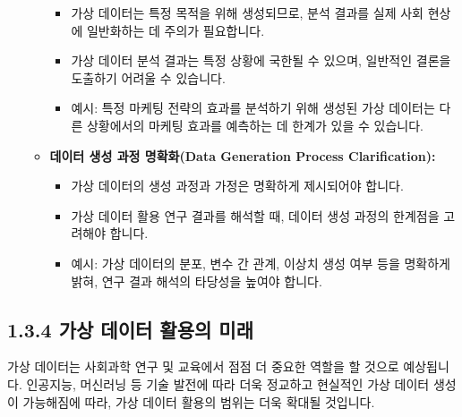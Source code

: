 \documentclass[
  letterpaper,
]{book}
\providecommand{\tightlist}{%
  \setlength{\itemsep}{0pt}\setlength{\parskip}{0pt}}
\begin{document}
\begin{itemize}
\begin{itemize}
    \begin{itemize}
    \tightlist
    \item
      가상 데이터는 특정 목적을 위해 생성되므로, 분석 결과를 실제 사회
      현상에 일반화하는 데 주의가 필요합니다.
    \item
      가상 데이터 분석 결과는 특정 상황에 국한될 수 있으며, 일반적인
      결론을 도출하기 어려울 수 있습니다.
    \item
      예시: 특정 마케팅 전략의 효과를 분석하기 위해 생성된 가상 데이터는
      다른 상황에서의 마케팅 효과를 예측하는 데 한계가 있을 수 있습니다.
    \end{itemize}
  \item
    \textbf{데이터 생성 과정 명확화(Data Generation Process
    Clarification):}

    \begin{itemize}
    \tightlist
    \item
      가상 데이터의 생성 과정과 가정은 명확하게 제시되어야 합니다.
    \item
      가상 데이터 활용 연구 결과를 해석할 때, 데이터 생성 과정의
      한계점을 고려해야 합니다.
    \item
      예시: 가상 데이터의 분포, 변수 간 관계, 이상치 생성 여부 등을
      명확하게 밝혀, 연구 결과 해석의 타당성을 높여야 합니다.
    \end{itemize}
  \end{itemize}
\end{itemize}

\subsection{1.3.4 가상 데이터 활용의
미래}\label{uxac00uxc0c1-uxb370uxc774uxd130-uxd65cuxc6a9uxc758-uxbbf8uxb798}

가상 데이터는 사회과학 연구 및 교육에서 점점 더 중요한 역할을 할 것으로
예상됩니다. 인공지능, 머신러닝 등 기술 발전에 따라 더욱 정교하고
현실적인 가상 데이터 생성이 가능해짐에 따라, 가상 데이터 활용의 범위는
더욱 확대될 것입니다.
\end{document}
